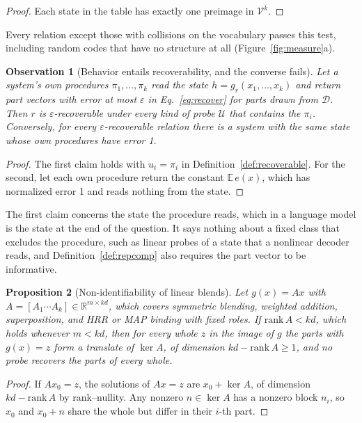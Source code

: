 \documentclass[10pt]{article}
\theoremstyle{plain}
\newtheorem{proposition}{Proposition}
\newtheorem{observation}[proposition]{Observation}
\theoremstyle{remark}
\newcommand{\R}{\mathbb{R}}
\newcommand{\U}{\mathcal{U}}
\newcommand{\D}{\mathcal{D}}
\newcommand{\Voc}{\mathcal{V}}
\begin{document}
\begin{proof}
Each state in the table has exactly one preimage in $\Voc^k$.
\end{proof}

\noindent
Every relation except those with collisions on the vocabulary passes this test, including random codes that have no structure at all (Figure~\ref{fig:measure}a).



\begin{observation}[Behavior entails recoverability, and the converse fails]
\label{prop:subset}
Let a system's own procedures $\pi_1, \ldots, \pi_k$ read the state $h = g_r(x_1, \ldots, x_k)$ and return part vectors with error at most $\varepsilon$ in Eq.~\eqref{eq:recover} for parts drawn from $\D$. Then $r$ is $\varepsilon$-recoverable under every kind of probe $\U$ that contains the $\pi_i$. Conversely, for every $\varepsilon$-recoverable relation there is a system with the same state whose own procedures have error 1.
\end{observation}

\begin{proof}
The first claim holds with $u_i = \pi_i$ in Definition~\ref{def:recoverable}. For the second, let each own procedure return the constant $\mathbb{E}\,e(x)$, which has normalized error 1 and reads nothing from the state.
\end{proof}

\noindent
The first claim concerns the state the procedure reads, which in a language model is the state at the end of the question. It says nothing about a fixed class that excludes the procedure, such as linear probes of a state that a nonlinear decoder reads, and Definition~\ref{def:repcomp} also requires the part vector to be informative.

\begin{proposition}[Non-identifiability of linear blends]
\label{prop:fiber}
Let $g(x) = Ax$ with $A = [A_1 \cdots A_k] \in \R^{m \times kd}$, which covers symmetric blending, weighted addition, superposition, and HRR or MAP binding with fixed roles. If $\mathrm{rank}\,A < kd$, which holds whenever $m < kd$, then for every whole $z$ in the image of $g$ the parts with $g(x) = z$ form a translate of $\ker A$, of dimension $kd - \mathrm{rank}\,A \geq 1$, and no probe recovers the parts of every whole.
\end{proposition}

\begin{proof}
If $Ax_0 = z$, the solutions of $Ax = z$ are $x_0 + \ker A$, of dimension $kd - \mathrm{rank}\,A$ by rank--nullity. Any nonzero $n \in \ker A$ has a nonzero block $n_i$, so $x_0$ and $x_0 + n$ share the whole but differ in their $i$-th part.
\end{proof}
\end{document}
